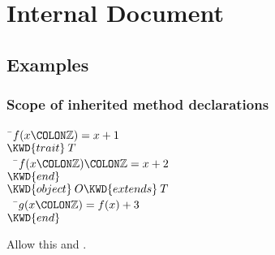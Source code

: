 %
%
%
%

\chapter{Internal Document}




\section{Examples}
\subsection{Scope of inherited method declarations}
\begin{Fortress}
{\tt~}\pushtabs\=\+\( f(x\COLON \mathbb{Z}) = x+1\)\\
\( \KWD{trait}\:T\)\\
{\tt~~}\pushtabs\=\+\(   f(x\COLON \mathbb{Z})\COLON \mathbb{Z} = x+2\)\-\\\poptabs
\( \KWD{end}\)\\
\( \KWD{object}\:O \KWD{extends}\:T\)\\
{\tt~~}\pushtabs\=\+\(   g(x\COLON \mathbb{Z}) = f(x) + 3\)\-\\\poptabs
\( \KWD{end}\)\-\\\poptabs
\end{Fortress}

Allow this and .

